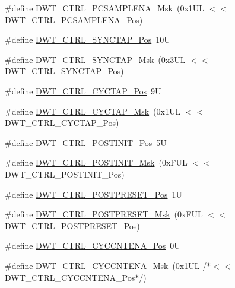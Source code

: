 \begin{DoxyCompactItemize}
\#define \mbox{\hyperlink{group___c_m_s_i_s___d_w_t_gafdcf1c86f43fbeaf2780ce797c9ef3d6}{D\+W\+T\+\_\+\+C\+T\+R\+L\+\_\+\+P\+C\+S\+A\+M\+P\+L\+E\+N\+A\+\_\+\+Msk}}~(0x1\+U\+L $<$$<$ D\+W\+T\+\_\+\+C\+T\+R\+L\+\_\+\+P\+C\+S\+A\+M\+P\+L\+E\+N\+A\+\_\+\+Pos)
\item 
\#define \mbox{\hyperlink{group___c_m_s_i_s___d_w_t_ga678ef08786edcbef964479217efb9284}{D\+W\+T\+\_\+\+C\+T\+R\+L\+\_\+\+S\+Y\+N\+C\+T\+A\+P\+\_\+\+Pos}}~10U
\item 
\#define \mbox{\hyperlink{group___c_m_s_i_s___d_w_t_gaf1e6c3729d56ecadeb6eeff4d225968c}{D\+W\+T\+\_\+\+C\+T\+R\+L\+\_\+\+S\+Y\+N\+C\+T\+A\+P\+\_\+\+Msk}}~(0x3\+U\+L $<$$<$ D\+W\+T\+\_\+\+C\+T\+R\+L\+\_\+\+S\+Y\+N\+C\+T\+A\+P\+\_\+\+Pos)
\item 
\#define \mbox{\hyperlink{group___c_m_s_i_s___d_w_t_gaf70b80936c7db60bf84fb6dadb8a3559}{D\+W\+T\+\_\+\+C\+T\+R\+L\+\_\+\+C\+Y\+C\+T\+A\+P\+\_\+\+Pos}}~9U
\item 
\#define \mbox{\hyperlink{group___c_m_s_i_s___d_w_t_ga6c12e2868b8989a69445646698b8c331}{D\+W\+T\+\_\+\+C\+T\+R\+L\+\_\+\+C\+Y\+C\+T\+A\+P\+\_\+\+Msk}}~(0x1\+U\+L $<$$<$ D\+W\+T\+\_\+\+C\+T\+R\+L\+\_\+\+C\+Y\+C\+T\+A\+P\+\_\+\+Pos)
\item 
\#define \mbox{\hyperlink{group___c_m_s_i_s___d_w_t_ga2868c0b28eb13be930afb819f55f6f25}{D\+W\+T\+\_\+\+C\+T\+R\+L\+\_\+\+P\+O\+S\+T\+I\+N\+I\+T\+\_\+\+Pos}}~5U
\item 
\#define \mbox{\hyperlink{group___c_m_s_i_s___d_w_t_gab8cbbee1e1d94d09f9a1f86379a08ee8}{D\+W\+T\+\_\+\+C\+T\+R\+L\+\_\+\+P\+O\+S\+T\+I\+N\+I\+T\+\_\+\+Msk}}~(0x\+F\+U\+L $<$$<$ D\+W\+T\+\_\+\+C\+T\+R\+L\+\_\+\+P\+O\+S\+T\+I\+N\+I\+T\+\_\+\+Pos)
\item 
\#define \mbox{\hyperlink{group___c_m_s_i_s___d_w_t_ga129bc152febfddd67a0c20c6814cba69}{D\+W\+T\+\_\+\+C\+T\+R\+L\+\_\+\+P\+O\+S\+T\+P\+R\+E\+S\+E\+T\+\_\+\+Pos}}~1U
\item 
\#define \mbox{\hyperlink{group___c_m_s_i_s___d_w_t_ga11d9e1e2a758fdd2657aa68ce61b9c9d}{D\+W\+T\+\_\+\+C\+T\+R\+L\+\_\+\+P\+O\+S\+T\+P\+R\+E\+S\+E\+T\+\_\+\+Msk}}~(0x\+F\+U\+L $<$$<$ D\+W\+T\+\_\+\+C\+T\+R\+L\+\_\+\+P\+O\+S\+T\+P\+R\+E\+S\+E\+T\+\_\+\+Pos)
\item 
\#define \mbox{\hyperlink{group___c_m_s_i_s___d_w_t_gaa4509f5f8514a7200be61691f0e01f10}{D\+W\+T\+\_\+\+C\+T\+R\+L\+\_\+\+C\+Y\+C\+C\+N\+T\+E\+N\+A\+\_\+\+Pos}}~0U
\item 
\#define \mbox{\hyperlink{group___c_m_s_i_s___d_w_t_ga4a9d209dc2a81ea6bfa0ea21331769d3}{D\+W\+T\+\_\+\+C\+T\+R\+L\+\_\+\+C\+Y\+C\+C\+N\+T\+E\+N\+A\+\_\+\+Msk}}~(0x1\+U\+L /$\ast$$<$$<$ D\+W\+T\+\_\+\+C\+T\+R\+L\+\_\+\+C\+Y\+C\+C\+N\+T\+E\+N\+A\+\_\+\+Pos$\ast$/)
$$
\end{DoxyCompactItemize}
